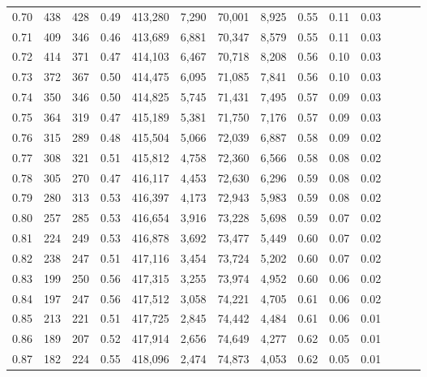 \begin{tabular}{rrrrrrrrrrrrrr}
0.70 &     438 &    428 &  0.49 &  413,280 &    7,290 &  70,001 &   8,925 &  0.55 &  0.11 &      0.03 \\
0.71 &     409 &    346 &  0.46 &  413,689 &    6,881 &  70,347 &   8,579 &  0.55 &  0.11 &      0.03 \\
0.72 &     414 &    371 &  0.47 &  414,103 &    6,467 &  70,718 &   8,208 &  0.56 &  0.10 &      0.03 \\
0.73 &     372 &    367 &  0.50 &  414,475 &    6,095 &  71,085 &   7,841 &  0.56 &  0.10 &      0.03 \\
0.74 &     350 &    346 &  0.50 &  414,825 &    5,745 &  71,431 &   7,495 &  0.57 &  0.09 &      0.03 \\
0.75 &     364 &    319 &  0.47 &  415,189 &    5,381 &  71,750 &   7,176 &  0.57 &  0.09 &      0.03 \\
0.76 &     315 &    289 &  0.48 &  415,504 &    5,066 &  72,039 &   6,887 &  0.58 &  0.09 &      0.02 \\
0.77 &     308 &    321 &  0.51 &  415,812 &    4,758 &  72,360 &   6,566 &  0.58 &  0.08 &      0.02 \\
0.78 &     305 &    270 &  0.47 &  416,117 &    4,453 &  72,630 &   6,296 &  0.59 &  0.08 &      0.02 \\
0.79 &     280 &    313 &  0.53 &  416,397 &    4,173 &  72,943 &   5,983 &  0.59 &  0.08 &      0.02 \\
0.80 &     257 &    285 &  0.53 &  416,654 &    3,916 &  73,228 &   5,698 &  0.59 &  0.07 &      0.02 \\
0.81 &     224 &    249 &  0.53 &  416,878 &    3,692 &  73,477 &   5,449 &  0.60 &  0.07 &      0.02 \\
0.82 &     238 &    247 &  0.51 &  417,116 &    3,454 &  73,724 &   5,202 &  0.60 &  0.07 &      0.02 \\
0.83 &     199 &    250 &  0.56 &  417,315 &    3,255 &  73,974 &   4,952 &  0.60 &  0.06 &      0.02 \\
0.84 &     197 &    247 &  0.56 &  417,512 &    3,058 &  74,221 &   4,705 &  0.61 &  0.06 &      0.02 \\
0.85 &     213 &    221 &  0.51 &  417,725 &    2,845 &  74,442 &   4,484 &  0.61 &  0.06 &      0.01 \\
0.86 &     189 &    207 &  0.52 &  417,914 &    2,656 &  74,649 &   4,277 &  0.62 &  0.05 &      0.01 \\
0.87 &     182 &    224 &  0.55 &  418,096 &    2,474 &  74,873 &   4,053 &  0.62 &  0.05 &      0.01 \\

\end{tabular}

